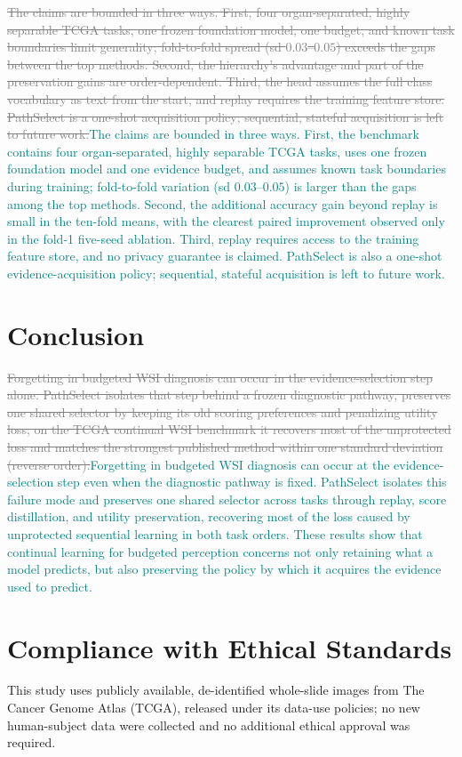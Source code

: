 \documentclass{article}
\newif\ifmarkup \markuptrue
\newcommand{\repc}[3]{\ifmarkup\textcolor{gray}{\sout{#2}}\textcolor{#1}{#3}\else#3\fi}
\newcommand{\repG}[2]{\repc{teal}{#1}{#2}}    %
\begin{document}
\repG{The claims are bounded in three ways. First, four organ-separated, highly separable TCGA tasks, one frozen foundation model, one budget, and known task boundaries limit generality; fold-to-fold spread (sd $0.03$--$0.05$) exceeds the gaps between the top methods. Second, the hierarchy's advantage and part of the preservation gains are order-dependent. Third, the head assumes the full class vocabulary as text from the start, and replay requires the training feature store. PathSelect is a one-shot acquisition policy; sequential, stateful acquisition is left to future work.}{The claims are bounded in three ways. First, the benchmark contains four organ-separated, highly separable TCGA tasks, uses one frozen foundation model and one evidence budget, and assumes known task boundaries during training; fold-to-fold variation (sd $0.03$--$0.05$) is larger than the gaps among the top methods. Second, the additional accuracy gain beyond replay is small in the ten-fold means, with the clearest paired improvement observed only in the fold-1 five-seed ablation. Third, replay requires access to the training feature store, and no privacy guarantee is claimed. PathSelect is also a one-shot evidence-acquisition policy; sequential, stateful acquisition is left to future work.}

\section{Conclusion}

\repG{Forgetting in budgeted WSI diagnosis can occur in the evidence-selection step alone. PathSelect isolates that step behind a frozen diagnostic pathway, preserves one shared selector by keeping its old scoring preferences and penalizing utility loss; on the TCGA continual WSI benchmark it recovers most of the unprotected loss and matches the strongest published method within one standard deviation (reverse order).}{Forgetting in budgeted WSI diagnosis can occur at the evidence-selection step even when the diagnostic pathway is fixed. PathSelect isolates this failure mode and preserves one shared selector across tasks through replay, score distillation, and utility preservation, recovering most of the loss caused by unprotected sequential learning in both task orders. These results show that continual learning for budgeted perception concerns not only retaining what a model predicts, but also preserving the policy by which it acquires the evidence used to predict.}




\section*{Compliance with Ethical Standards}
This study uses publicly available, de-identified whole-slide images from The Cancer Genome Atlas (TCGA), released under its data-use policies; no new human-subject data were collected and no additional ethical approval was required.
\end{document}
